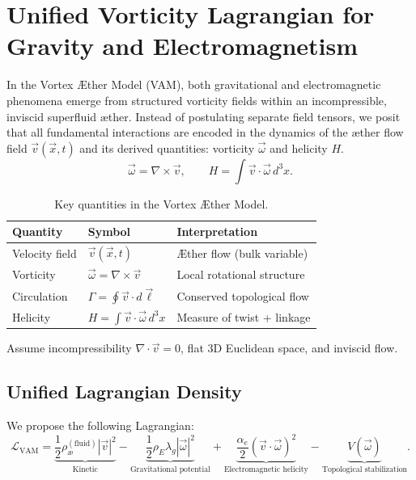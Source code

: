 \documentclass[preprint]{revtex4-2}
\begin{document}
\section{Unified Vorticity Lagrangian for Gravity and Electromagnetism}

In the Vortex \AE{}ther Model (VAM), both gravitational and electromagnetic phenomena emerge from structured vorticity fields within an incompressible, inviscid superfluid \ae{}ther. Instead of postulating separate field tensors, we posit that all fundamental interactions are encoded in the dynamics of the \ae{}ther flow field $\vec{v}(\vec{x}, t)$ and its derived quantities: vorticity $\vec{\omega}$ and helicity $H$.
\[
\vec{\omega} = \nabla \times \vec{v}, \qquad H = \int \vec{v} \cdot \vec{\omega} \, d^3x.
\]
\begin{table}[H]
\centering
\begin{tabular}{|l|l|l|}
\hline
\textbf{Quantity} & \textbf{Symbol} & \textbf{Interpretation} \\
\hline
Velocity field & $\vec{v}(\vec{x}, t)$ & Æther flow (bulk variable) \\
Vorticity & $\vec{\omega} = \nabla \times \vec{v}$ & Local rotational structure \\
Circulation & $\Gamma = \oint \vec{v} \cdot d\vec{\ell}$ & Conserved topological flow \\
Helicity & $H = \int \vec{v} \cdot \vec{\omega} \, d^3x$ & Measure of twist + linkage \\
\hline
\end{tabular}
\caption{Key quantities in the Vortex Æther Model.}
\end{table}

Assume incompressibility \( \nabla \cdot \vec{v} = 0 \), flat 3D Euclidean space, and inviscid flow.

\subsection{Unified Lagrangian Density}

We propose the following Lagrangian:
\begin{equation}
\mathcal{L}_{\text{VAM}} =
\underbrace{\frac{1}{2} \rho_\text{\ae}^{(\text{fluid})} |\vec{v}|^2}_{\text{Kinetic}}
- \underbrace{\frac{1}{2} \rho_{\scriptscriptstyle\boldsymbol\!E}\lambda_g |\vec{\omega}|^2}_{\text{Gravitational potential}}
+ \underbrace{\frac{\alpha_e}{2} (\vec{v} \cdot \vec{\omega})^2}_{\text{Electromagnetic helicity}}
- \underbrace{V(\vec{\omega})}_{\text{Topological stabilization}}.
\end{equation}
\end{document}
